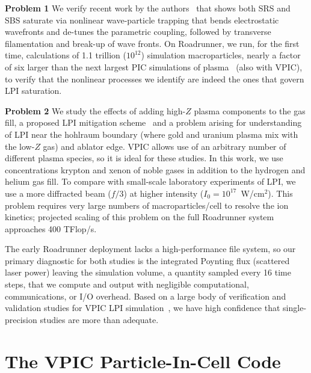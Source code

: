 \documentclass[letter,10pt]{article}
\begin{document}
\textbf{Problem 1}
We verify 
recent work by the authors~\cite{} that shows both SRS and SBS saturate via nonlinear 
wave-particle trapping that bends electrostatic wavefronts and de-tunes the parametric 
coupling, followed by transverse filamentation and break-up of wave fronts.  
On Roadrunner, we run, for the first time, calculations of 1.1 trillion ($10^{12}$) 
simulation macroparticles, nearly a factor of six larger than the next largest PIC 
simulations of plasma~\cite{} (also with VPIC), to verify that the nonlinear processes 
we identify are indeed the ones that govern LPI saturation.  

\textbf{Problem 2}
We study the effects of adding high-$Z$ plasma components to the gas fill, a 
proposed LPI mitigation scheme~\cite{} and a problem arising for understanding of 
LPI near the hohlraum boundary (where gold and uranium plasma mix with the low-$Z$ gas) 
and ablator edge.  VPIC allows use of an arbitrary number of different plasma species, 
so it is ideal for these studies.  In this work, we use concentrations krypton and 
xenon of noble gases in addition to the hydrogen and helium gas fill.  To compare 
with small-scale laboratory experiments of LPI, we use a more diffracted beam ($f/3$) 
at higher intensity ($I_0 = 10^{17}$~W/cm$^2$). This problem requires very large numbers
of macroparticles/cell to resolve the ion kinetics; projected scaling of this problem 
on the full Roadrunner system approaches 400 TFlop/s.  

The early Roadrunner deployment lacks a high-performance file system, so our primary 
diagnostic for both studies is the integrated Poynting flux (scattered laser power) 
leaving the simulation volume, a quantity sampled every 16 time steps, that we compute 
and output with negligible computational, communications, or I/O overhead.  Based 
on a large body of verification and validation studies 
for VPIC LPI simulation~\cite{}, we have high confidence that single-precision studies 
are more than adequate. 


\section*{The VPIC Particle-In-Cell Code}
\end{document}
